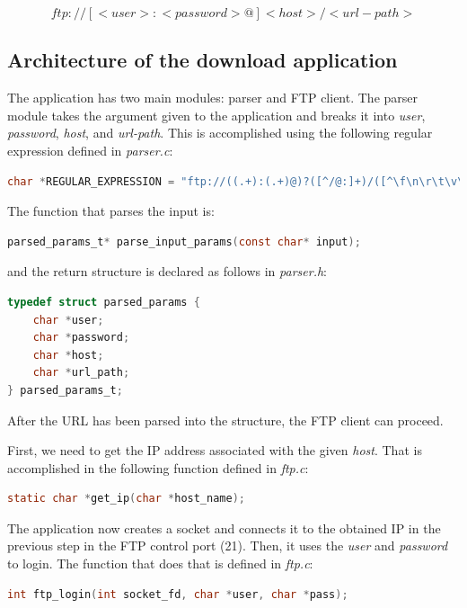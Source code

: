 \documentclass[a4paper,11pt,english]{article}
\begin{document}
    $$ ftp://[<user>:<password>@]<host>/<url-path> $$
    

    \subsection{Architecture of the download application}
        The application has two main modules: parser and FTP client.
        The parser module takes the argument given to the application and breaks it into
        \textit{user}, \textit{password}, \textit{host}, and \textit{url-path}.
        This is accomplished using the following regular expression defined in \textit{parser.c}:

\begin{lstlisting}[language=C]
char *REGULAR_EXPRESSION = "ftp://((.+):(.+)@)?([^/@:]+)/([^\f\n\r\t\v\x20]*)";
\end{lstlisting}
        
        \noindent The function that parses the input is:
\begin{lstlisting}[language=C]
parsed_params_t* parse_input_params(const char* input);
\end{lstlisting}

        \noindent and the return structure is declared as follows in \textit{parser.h}:
\begin{lstlisting}[language=C]
typedef struct parsed_params {
    char *user;
    char *password;
    char *host;
    char *url_path;
} parsed_params_t;
\end{lstlisting}

        \noindent After the URL has been parsed into the structure, the FTP client can proceed.

        First, we need to get the IP address associated with the given \textit{host}. That is accomplished
        in the following function defined in \textit{ftp.c}:
\begin{lstlisting}[language=C]
static char *get_ip(char *host_name);
\end{lstlisting}   

        \noindent The application now creates a socket and connects it to the obtained IP in the previous step in
        the FTP control port (21). Then, it uses the \textit{user} and \textit{password} to login. The function
        that does that is defined in \textit{ftp.c}:
\begin{lstlisting}[language=C]
int ftp_login(int socket_fd, char *user, char *pass);
\end{lstlisting}
\end{document}
